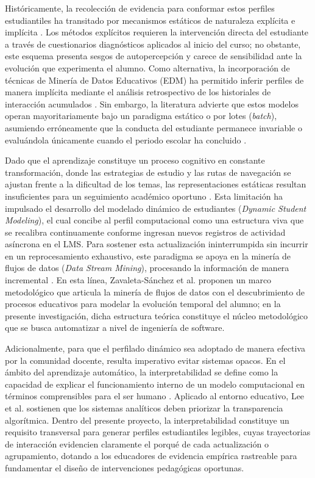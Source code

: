 Históricamente, la recolección de evidencia para conformar estos perfiles estudiantiles ha transitado por mecanismos estáticos de naturaleza explícita e implícita \cite{Brusilovsky2007, Abyaa2019}. Los métodos explícitos requieren la intervención directa del estudiante a través de cuestionarios diagnósticos aplicados al inicio del curso; no obstante, este esquema presenta sesgos de autopercepción y carece de sensibilidad ante la evolución que experimenta el alumno. Como alternativa, la incorporación de técnicas de Minería de Datos Educativos (EDM) ha permitido inferir perfiles de manera implícita mediante el análisis retrospectivo de los historiales de interacción acumulados \cite{Chrysafiadi2013}. Sin embargo, la literatura advierte que estos modelos operan mayoritariamente bajo un paradigma estático o por lotes (\textit{batch}), asumiendo erróneamente que la conducta del estudiante permanece invariable o evaluándola únicamente cuando el periodo escolar ha concluido \cite{Zahoor2025}.

Dado que el aprendizaje constituye un proceso cognitivo en constante transformación, donde las estrategias de estudio y las rutas de navegación se ajustan frente a la dificultad de los temas, las representaciones estáticas resultan insuficientes para un seguimiento académico oportuno \cite{Abyaa2019, Zahoor2025}. Esta limitación ha impulsado el desarrollo del modelado dinámico de estudiantes (\textit{Dynamic Student Modeling}), el cual concibe al perfil computacional como una estructura viva que se recalibra continuamente conforme ingresan nuevos registros de actividad asíncrona en el LMS. Para sostener esta actualización ininterrumpida sin incurrir en un reprocesamiento exhaustivo, este paradigma se apoya en la minería de flujos de datos (\textit{Data Stream Mining}), procesando la información de manera incremental \cite{Gama2010}. En esta línea, Zavaleta-Sánchez et al. \cite{YeseniaZavaleta-Sanchez2025} proponen un marco metodológico que articula la minería de flujos de datos con el descubrimiento de procesos educativos para modelar la evolución temporal del alumno; en la presente investigación, dicha estructura teórica constituye el núcleo metodológico que se busca automatizar a nivel de ingeniería de software.

Adicionalmente, para que el perfilado dinámico sea adoptado de manera efectiva por la comunidad docente, resulta imperativo evitar sistemas opacos. En el ámbito del aprendizaje automático, la interpretabilidad se define como la capacidad de explicar el funcionamiento interno de un modelo computacional en términos comprensibles para el ser humano \cite{BarredoArrieta2020}. Aplicado al entorno educativo, Lee et al. \cite{Lee2025} sostienen que los sistemas analíticos deben priorizar la transparencia algorítmica. Dentro del presente proyecto, la interpretabilidad constituye un requisito transversal para generar perfiles estudiantiles legibles, cuyas trayectorias de interacción evidencien claramente el porqué de cada actualización o agrupamiento, dotando a los educadores de evidencia empírica rastreable para fundamentar el diseño de intervenciones pedagógicas oportunas.

